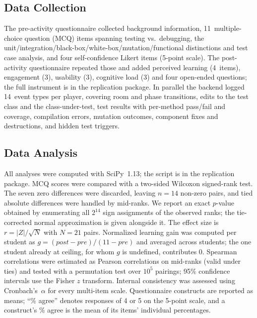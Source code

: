 \documentclass[conference]{IEEEtran}
\begin{document}
\subsection{Data Collection}

The pre-activity questionnaire collected background information, 11~multiple-choice question (MCQ) items spanning testing vs.\ debugging, the unit/integration/black-box/white-box/mutation/functional distinctions and test case analysis, and four self-confidence Likert items (5-point scale). The post-activity questionnaire repeated those and added perceived learning (4~items), engagement (3), usability (3), cognitive load (3) and four open-ended questions; the full instrument is in the replication package.
In parallel the backend logged 14~event types per player, covering room and phase transitions, edits to the test class and the class-under-test, test results with per-method pass/fail and coverage, compilation errors, mutation outcomes, component fixes and destructions, and hidden test triggers.

\subsection{Data Analysis}

All analyses were computed with SciPy~1.13; the script is in the replication package.
MCQ scores were compared with a two-sided Wilcoxon signed-rank test. The seven zero differences were discarded, leaving $n = 14$ non-zero pairs, and tied absolute differences were handled by mid-ranks. We report an exact $p$-value obtained by enumerating all $2^{14}$ sign assignments of the observed ranks; the tie-corrected normal approximation is given alongside it. The effect size is $r = |Z|/\sqrt{N}$ with $N = 21$ pairs.
Normalized learning gain was computed per student as $g = (post - pre)/(11 - pre)$ and averaged across students; the one student already at ceiling, for whom $g$ is undefined, contributes 0.
Spearman correlations were estimated as Pearson correlations on mid-ranks (valid under ties) and tested with a permutation test over $10^5$ pairings; 95\% confidence intervals use the Fisher $z$ transform.
Internal consistency was assessed using Cronbach's~$\alpha$ for every multi-item scale.
Questionnaire constructs are reported as means; ``\% agree'' denotes responses of 4 or 5 on the 5-point scale, and a construct's \% agree is the mean of its items' individual percentages.

\end{document}

